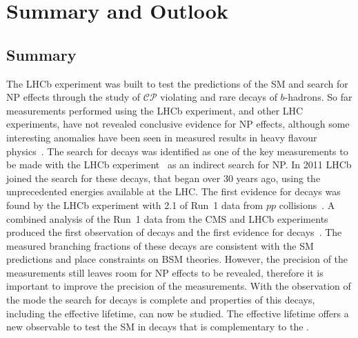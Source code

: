 \chapter{{\bf Summary and Outlook}}
\label{sec:summaryandoutlook}

\section{Summary}
The LHCb experiment was built to test the predictions of the SM and search for NP effects through the study of $\mathcal{CP}$ violating and rare decays of $b$-hadrons. So far measurements performed using the LHCb experiment, and other LHC experiments, have not revealed conclusive evidence for NP effects, although some interesting anomalies have been seen in measured results in heavy flavour physics~\cite{PhysRevLett.118.111801,Aaij:2014pli, Aaij:2015oid, ATLAS-CONF-2017-023,CMS-PAS-BPH-15-008,Aaij:2015esa,PhysRevLett.113.151601,Aaij:2017vbb,Aaij:2015yra,Huschle:2015rga, Lees:2012xj,Lees:2013uzd, Sato:2016svk,Altmannshofer:2017yso,Capdevila:2017bsm,Amhis:2016xyh}. 
The search for \bmumu decays was identified as one of the key measurements to be made with the LHCb experiment~\cite{Adeva:2009ny} as an indirect search for NP.
In 2011 LHCb joined the search for these decays, that began over 30 years ago, using the unprecedented energies available at the LHC. The first evidence for \bsmumu decays was found by the LHCb experiment with 2.1 \fb of Run~1 data from $pp$ collisions~\cite{Aaij:2012nna}. A combined analysis of the Run~1 data from the CMS and LHCb experiments produced the first observation of \bsmumu decays and the first evidence for \bdmumu decays~\cite{CMS:2014xfa}. The measured branching fractions of these decays are consistent with the SM predictions and place constraints on BSM theories. However, the precision of the measurements still leaves room for NP effects to be revealed, therefore it is important to improve the precision of the \BF measurements. With the observation of the \bs mode the search for \bsmumu decays is complete and properties of this decays, including the effective lifetime, can now be studied. The effective lifetime offers a new observable to test the SM in \bsmumu decays that is complementary to the \BF. 

